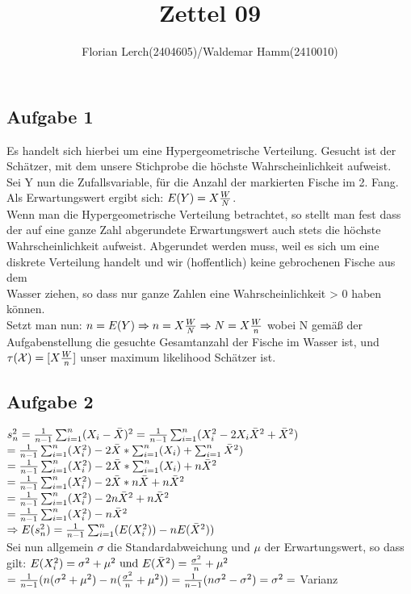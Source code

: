 \documentclass[11pt]{amsart}
\title{Zettel 09 }
\author{Florian Lerch(2404605)/Waldemar Hamm(2410010)}
\begin{document}
\maketitle

\subsection*{Aufgabe 1}

Es handelt sich hierbei um eine Hypergeometrische Verteilung. Gesucht ist der Schätzer, mit dem unsere Stichprobe die höchste Wahrscheinlichkeit aufweist.\\
Sei Y nun die Zufallsvariable, für die Anzahl der markierten Fische im 2. Fang. Als Erwartungswert ergibt sich: $E(Y) = X \frac{W}{N}$. \\
Wenn man die Hypergeometrische Verteilung betrachtet, so stellt man fest dass der auf eine ganze Zahl abgerundete Erwartungswert auch stets die höchste \\
Wahrscheinlichkeit aufweist. Abgerundet werden muss, weil es sich um eine diskrete Verteilung handelt und wir (hoffentlich) keine gebrochenen Fische aus dem \\
Wasser ziehen, so dass nur ganze Zahlen eine Wahrscheinlichkeit > 0 haben können. \\
Setzt man nun: $n = E(Y) \Rightarrow n = X \frac{W}{N} \Rightarrow N = X \frac{W}{n}$ wobei N gemäß der Aufgabenstellung die gesuchte Gesamtanzahl der Fische im Wasser ist, und \\
$\tau(\mathcal{X}) = [X \frac{W}{n}]$ unser maximum likelihood Schätzer ist.

\subsection*{Aufgabe 2}
\( s^2_n = \frac{1}{n-1}\sum_{i=1}^n(X_i - \bar{X})^2 = \frac{1}{n-1}\sum_{i=1}^n(X_i^2 - 2X_i\bar{X}^2 +\bar{X}^2) \) \\
\( = \frac{1}{n-1}\sum_{i=1}^n(X_i^2) - 2\bar{X}* \sum_{i=1}^n(X_i)  + \sum_{i=1}^n\bar{X}^2) \) \\
\( = \frac{1}{n-1}\sum_{i=1}^n(X_i^2) - 2\bar{X} * \sum_{i=1}^n(X_i) + n\bar{X}^2 \) \\
\( = \frac{1}{n-1}\sum_{i=1}^n(X_i^2) - 2\bar{X} *n\bar{X} + n\bar{X}^2 \) \\
\( = \frac{1}{n-1}\sum_{i=1}^n(X_i^2) - 2n\bar{X}^2 + n\bar{X}^2 \) \\
\( = \frac{1}{n-1}\sum_{i=1}^n(X_i^2) - n\bar{X}^2 \) \\
\( \Rightarrow E(s^2_n) = \frac{1}{n-1}\sum_{i=1}^n(E(X_i^2)) - nE(\bar{X}^2)) \) \\
Sei nun allgemein $\sigma$ die Standardabweichung und $\mu$ der Erwartungswert, so dass gilt: \(E(X_i^2) = \sigma^2 + \mu^2 \mbox{ und } E(\bar{X}^2) = \frac{\sigma^2}{n} + \mu^2 \) \\
\( = \frac{1}{n-1}(n(\sigma^2 + \mu^2) - n(\frac{\sigma^2}{n}+\mu^2)) = \frac{1}{n-1}(n\sigma^2-\sigma^2) = \sigma^2 = \) Varianz \\
\newpage
\end{document}
